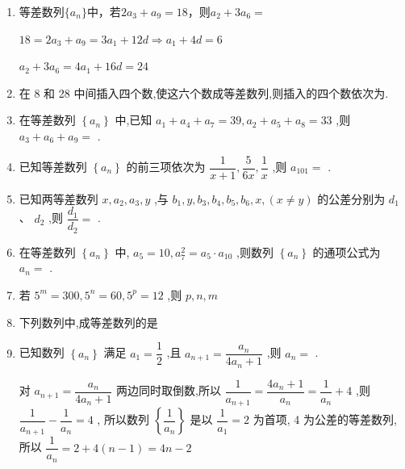 \begin{enumerate}
    \item 等差数列$\{a_n\}$中，若$2a_3+a_9 = 18$，则$a_2+3a_6 = $
    \begin{jieda}
        $18 = 2a_3+a_9 = 3a_1+12d \Longrightarrow a_1 + 4d = 6$

        $a_2+3a_6 = 4a_1 + 16d = 24$
    \end{jieda}
    \item 在 8 和 28 中间插入四个数,使这六个数成等差数列,则插入的四个数依次为.
    
    \item 在等差数列 $\left\{  {a}_{n}\right\}$ 中,已知 ${a}_{1} + {a}_{4} + {a}_{7} = {39},{a}_{2} + {a}_{5} + {a}_{8} = {33}$ ,则 ${a}_{3} + {a}_{6} + {a}_{9} =$ .
    
    \item 已知等差数列 $\left\{  {a}_{n}\right\}$ 的前三项依次为 $\dfrac{1}{x + 1},\dfrac{5}{6x},\dfrac{1}{x}$ ,则 ${a}_{101} =$ .
    
    \item 已知两等差数列 $x,{a}_{2},{a}_{3},y$ ,与 ${b}_{1},y,{b}_{3},{b}_{4},{b}_{5},{b}_{6},x,\left( {x \neq  y}\right)$ 的公差分别为 ${d}_{1}$ 、 ${d}_{2}$ ,则 $\dfrac{{d}_{1}}{{d}_{2}} =$ .
    
    \item 在等差数列 $\left\{  {a}_{n}\right\}$ 中, ${a}_{5} = {10},{a}_{7}^{2} = {a}_{5} \cdot  {a}_{10}$ ,则数列 $\left\{  {a}_{n}\right\}$ 的通项公式为 ${a}_{n} =$ .
    
    
    \item 若 ${5}^{m} = {300},{5}^{n} = {60},{5}^{p} = {12}$ ,则 $p,n,m$ 
    
    \item 下列数列中,成等差数列的是

    
    \item 已知数列 $\left\{  {a}_{n}\right\}$ 满足 ${a}_{1} = \dfrac{1}{2}$ ,且 ${a}_{n + 1} = \dfrac{{a}_{n}}{4{a}_{n} + 1}$ ,则 ${a}_{n} =$ .
    \begin{jieda}
        对 ${a}_{n + 1} = \dfrac{{a}_{n}}{4{a}_{n} + 1}$ 两边同时取倒数,所以 $\dfrac{1}{{a}_{n + 1}} = \dfrac{4{a}_{n} + 1}{{a}_{n}} = \dfrac{1}{{a}_{n}} + 4$ ,则 $\dfrac{1}{{a}_{n + 1}} - \dfrac{1}{{a}_{n}} = 4$ , 所以数列 $\left\{  \dfrac{1}{{a}_{n}}\right\}$ 是以 $\dfrac{1}{{a}_{1}} = 2$ 为首项, 4 为公差的等差数列,所以 $\dfrac{1}{{a}_{n}} = 2 + 4\left( {n - 1}\right)  = {4n} - 2$ 
        

\end{jieda}
\end{enumerate}
